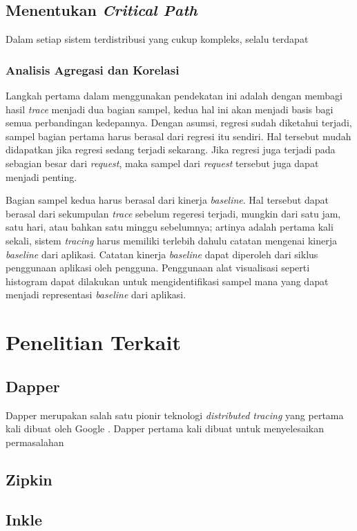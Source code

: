\subsection{Menentukan \textit{Critical Path}}
\label{approach-cp}
Dalam setiap sistem terdistribusi yang cukup kompleks, selalu terdapat 

\subsubsection{Analisis Agregasi dan Korelasi}
\label{approach-corr}

Langkah pertama dalam menggunakan pendekatan ini adalah dengan membagi hasil \textit{trace} menjadi dua bagian sampel, kedua hal ini akan menjadi basis bagi semua perbandingan kedepannya. Dengan asumsi, regresi sudah diketahui terjadi, sampel bagian pertama harus berasal dari regresi itu sendiri. Hal tersebut mudah didapatkan jika regresi sedang terjadi sekarang. Jika regresi juga terjadi pada sebagian besar dari \textit{request}, maka sampel dari \textit{request} tersebut juga dapat menjadi penting. 

Bagian sampel kedua harus berasal dari kinerja \textit{baseline}. Hal tersebut dapat berasal dari sekumpulan \textit{trace} sebelum regeresi terjadi, mungkin dari satu jam, satu hari, atau bahkan satu minggu sebelumnya; artinya adalah pertama kali sekali, sistem \textit{tracing} harus memiliki terlebih dahulu catatan mengenai kinerja \textit{baseline} dari aplikasi. Catatan kinerja \textit{baseline} dapat diperoleh dari siklus penggunaan aplikasi oleh pengguna. Penggunaan alat visualisasi seperti histogram dapat dilakukan untuk mengidentifikasi sampel mana yang dapat menjadi representasi \textit{baseline} dari aplikasi.


\section{Penelitian Terkait}

\subsection{Dapper}

Dapper merupakan salah satu pionir teknologi \textit{distributed tracing} yang pertama kali dibuat oleh Google \citep{dapper-paper}. Dapper pertama kali dibuat untuk menyelesaikan permasalahan 

\subsection{Zipkin}

\subsection{Inkle}

